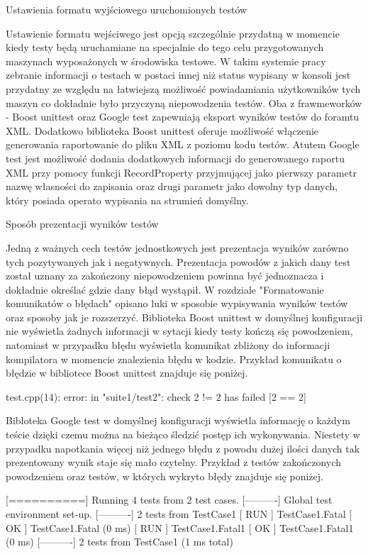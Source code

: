 Ustawienia formatu wyjściowego uruchomionych testów

Ustawienie formatu wejściwego jest opcją szczególnie przydatną w momencie kiedy testy będą uruchamiane na specjalnie do tego celu przygotowanych maszynach wyposażonych w środowiska testowe. W takim systemie pracy zebranie informacji o testach w postaci innej niż status wypisany w konsoli jest przydatny ze względu na łatwiejszą możliwość powiadamiania użytkowników tych maszyn co dokładnie było przyczyną niepowodzenia testów.
Oba z frawmeworków - Boost unittest oraz Google test zapewniają eksport wyników testów do foramtu XML. Dodatkowo biblioteka Boost unittest oferuje możliwość włączenie generowania raportowanie do pliku XML z poziomu kodu testów. Atutem Google test jest możliwość dodania dodatkowych informacji do generowanego raportu XML przy pomocy funkcji 	RecordProperty przyjmującej jako pierwszy parametr nazwę własności do zapisania oraz drugi parametr jako dowolny typ danych, który posiada operato wypisania na strumień domyślny.

Sposób prezentacji wyników testów

Jedną z ważnych cech testów jednostkowych jest prezentacja wyników zarówno tych pozytywanych jak i negatywnych. Prezentacja powodów z jakich dany test został uznany za zakończony niepowodzeniem powinna być jednoznacza i dokładnie określać gdzie dany błąd wystąpił.
W rozdziale "Formatowanie komunikatów o błędach" opisano luki w sposobie wypisywania wyników testów oraz sposoby jak je rozszerzyć.
Biblioteka Boost unittest w domyślnej konfiguracji nie wyświetla żadnych informacji w sytacji kiedy testy kończą się powodzeniem, natomiast w przypadku błędu wyświetla komunikat zbliżony do informacji kompilatora w momencie znalezienia błędu w kodzie.
Przykład komunikatu o błędzie w bibliotece Boost unittest znajduje się poniżej.

test.cpp(14): error: in "suite1/test2": check 2 != 2 has failed [2 == 2]

Bibloteka Google test w domyślnej konfiguracji wyświetla informację o każdym teście dzięki czemu można na bieżąco śledzić postęp ich wykonywania. Niestety w przypadku napotkania więcej niż jednego błędu z powodu dużej ilości danych tak prezentowany wynik staje się mało czytelny. Przykład z testów zakończonych powodzeniem oraz testów, w których wykryto błędy znajduje się poniżej.

[==========] Running 4 tests from 2 test cases.
[----------] Global test environment set-up.
[----------] 2 tests from TestCase1
[ RUN      ] TestCase1.Fatal
[       OK ] TestCase1.Fatal (0 ms)
[ RUN      ] TestCase1.Fatal1
[       OK ] TestCase1.Fatal1 (0 ms)
[----------] 2 tests from TestCase1 (1 ms total)

